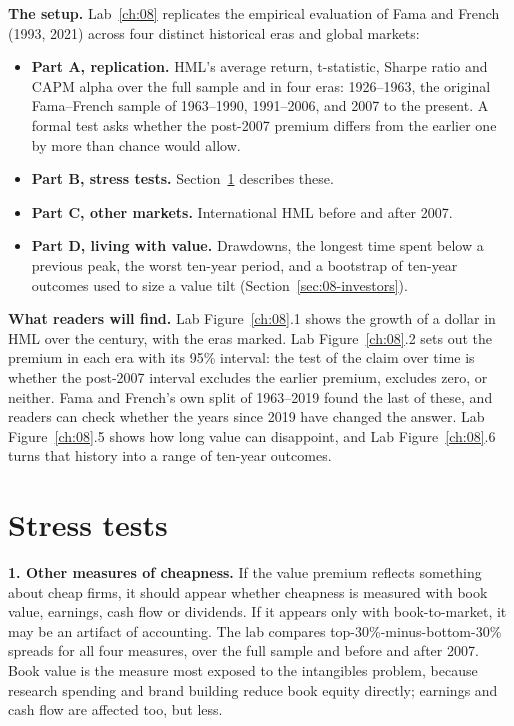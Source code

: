 \textbf{The setup.} Lab~\ref{ch:08} replicates the empirical evaluation of Fama and French (1993, 2021) across four distinct historical eras and global markets:

\begin{itemize}
  \item \textbf{Part A, replication.} HML's average return, t-statistic, Sharpe ratio and CAPM alpha over the full sample and in four eras: 1926--1963, the original Fama--French sample of 1963--1990, 1991--2006, and 2007 to the present. A formal test asks whether the post-2007 premium differs from the earlier one by more than chance would allow.
  \item \textbf{Part B, stress tests.} Section~\ref{sec:08-stress} describes these.
  \item \textbf{Part C, other markets.} International HML before and after 2007.
  \item \textbf{Part D, living with value.} Drawdowns, the longest time spent below a previous peak, the worst ten-year period, and a bootstrap of ten-year outcomes used to size a value tilt (Section~\ref{sec:08-investors}).
\end{itemize}

\textbf{What readers will find.} Lab Figure~\ref{ch:08}.1 shows the growth of a dollar in HML over the century, with the eras marked. Lab Figure~\ref{ch:08}.2 sets out the premium in each era with its 95\% interval: the test of the claim over time is whether the post-2007 interval excludes the earlier premium, excludes zero, or neither. Fama and French's own split of 1963--2019 found the last of these, and readers can check whether the years since 2019 have changed the answer. Lab Figure~\ref{ch:08}.5 shows how long value can disappoint, and Lab Figure~\ref{ch:08}.6 turns that history into a range of ten-year outcomes.

\section{Stress tests}
\label{sec:08-stress}

\textbf{1. Other measures of cheapness.} If the value premium reflects something about cheap firms, it should appear whether cheapness is measured with book value, earnings, cash flow or dividends. If it appears only with book-to-market, it may be an artifact of accounting. The lab compares top-30\%-minus-bottom-30\% spreads for all four measures, over the full sample and before and after 2007. Book value is the measure most exposed to the intangibles problem, because research spending and brand building reduce book equity directly; earnings and cash flow are affected too, but less.

